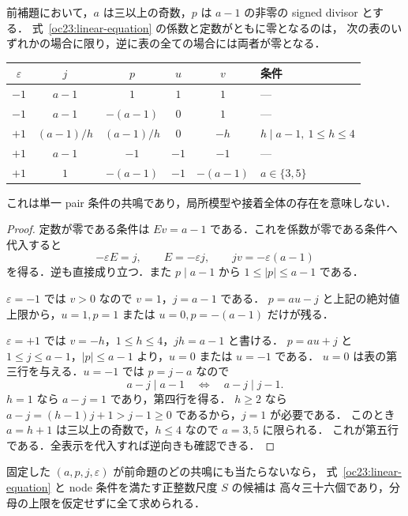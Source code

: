 \begin{proposition}[全共鳴の分類]
\label{oc23:resonances}
前補題において，$a$ は三以上の奇数，$p$ は $a-1$ の非零の signed divisor とする．
式~\eqref{oc23:linear-equation} の係数と定数がともに零となるのは，
次の表のいずれかの場合に限り，逆に表の全ての場合には両者が零となる．
\begin{center}\small
\begin{tabular}{c|c|c|c|c|l}
 $\varepsilon$&$j$&$p$&$u$&$v$&条件\\\hline
 $-1$&$a-1$&$1$&$1$&$1$&---\\
 $-1$&$a-1$&$-(a-1)$&$0$&$1$&---\\
 $+1$&$(a-1)/h$&$(a-1)/h$&$0$&$-h$&$h\mid a-1,\ 1\le h\le4$\\
 $+1$&$a-1$&$-1$&$-1$&$-1$&---\\
 $+1$&$1$&$-(a-1)$&$-1$&$-(a-1)$&$a\in\{3,5\}$
\end{tabular}
\end{center}
これは単一 pair 条件の共鳴であり，局所模型や接着全体の存在を意味しない．
\end{proposition}

\begin{proof}
定数が零である条件は $Ev=a-1$ である．これを係数が零である条件へ代入すると
\[
 -\varepsilon E=j,\qquad
 E=-\varepsilon j,\qquad
 jv=-\varepsilon(a-1)
\]
を得る．逆も直接成り立つ．また $p\mid a-1$ から
$1\le |p|\le a-1$ である．

$\varepsilon=-1$ では $v>0$ なので $v=1$，$j=a-1$ である．
$p=au-j$ と上記の絶対値上限から，$u=1,p=1$ または
$u=0,p=-(a-1)$ だけが残る．

$\varepsilon=+1$ では $v=-h$，$1\le h\le4$，$jh=a-1$ と書ける．
$p=au+j$ と $1\le j\le a-1$，$|p|\le a-1$ より，$u=0$ または $u=-1$ である．
$u=0$ は表の第三行を与える．$u=-1$ では $p=j-a$ なので
\[
 a-j\mid a-1\quad\Longleftrightarrow\quad a-j\mid j-1.
\]
$h=1$ なら $a-j=1$ であり，第四行を得る．
$h\ge2$ なら $a-j=(h-1)j+1>j-1\ge0$ であるから，$j=1$ が必要である．
このとき $a=h+1$ は三以上の奇数で，$h\le4$ なので $a=3,5$ に限られる．
これが第五行である．全表示を代入すれば逆向きも確認できる．
\end{proof}

\begin{corollary}[非共鳴時の有限尺度候補]
\label{oc23:finite-scale}
固定した $(a,p,j,\varepsilon)$ が前命題のどの共鳴にも当たらないなら，
式~\eqref{oc23:linear-equation} と node 条件を満たす正整数尺度 $S$ の候補は
高々三十六個であり，分母の上限を仮定せずに全て求められる．
\end{corollary}

